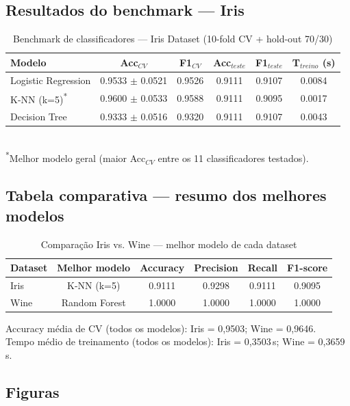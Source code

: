 \documentclass[12pt,a4paper]{article}
\begin{document}
\subsection{Resultados do benchmark --- Iris}

\begin{table}[H]
\centering
\caption{Benchmark de classificadores --- Iris Dataset (10-fold CV + hold-out 70/30)}
\begin{tabular}{lccccc}
\toprule
Modelo & Acc$_{CV}$ & F1$_{CV}$ & Acc$_{teste}$ & F1$_{teste}$ & T$_{treino}$ (s) \\
\midrule
Logistic Regression & 0.9533 $\pm$ 0.0521 & 0.9526 & 0.9111 & 0.9107 & 0.0084 \\
K-NN (k=5)\textsuperscript{*} & 0.9600 $\pm$ 0.0533 & 0.9588 & 0.9111 & 0.9095 & 0.0017 \\
Decision Tree        & 0.9333 $\pm$ 0.0516 & 0.9320 & 0.9111 & 0.9107 & 0.0043 \\
\bottomrule
\end{tabular}
\\[0.2cm]
\footnotesize{\textsuperscript{*}Melhor modelo geral (maior Acc$_{CV}$ entre os 11 classificadores testados).}
\end{table}

\subsection{Tabela comparativa --- resumo dos melhores modelos}

\begin{table}[H]
\centering
\caption{Comparação Iris vs. Wine --- melhor modelo de cada dataset}
\begin{tabular}{lccccc}
\toprule
Dataset & Melhor modelo & Accuracy & Precision & Recall & F1-score \\
\midrule
Iris & K-NN (k=5)      & 0.9111 & 0.9298 & 0.9111 & 0.9095 \\
Wine & Random Forest   & 1.0000 & 1.0000 & 1.0000 & 1.0000 \\
\bottomrule
\end{tabular}
\end{table}

\noindent Accuracy média de CV (todos os modelos): Iris = 0{,}9503; Wine = 0{,}9646.\\
Tempo médio de treinamento (todos os modelos): Iris = 0{,}3503\,s; Wine = 0{,}3659\,s.

\subsection{Figuras}
\end{document}
